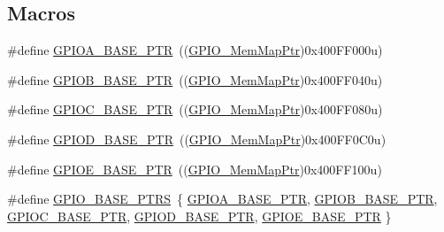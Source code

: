 \subsection*{Macros}
\begin{DoxyCompactItemize}
\item 
\#define \hyperlink{group___g_p_i_o___peripheral_ga3a8bd75d8b47b51132005ce9bbcbab7f}{G\+P\+I\+O\+A\+\_\+\+B\+A\+S\+E\+\_\+\+P\+TR}~((\hyperlink{group___g_p_i_o___peripheral_ga31c1eddda45aa085f51142987e05ada5}{G\+P\+I\+O\+\_\+\+Mem\+Map\+Ptr})0x400\+F\+F000u)
\item 
\#define \hyperlink{group___g_p_i_o___peripheral_ga3f4701cf222c28bfdcc2768a296b4171}{G\+P\+I\+O\+B\+\_\+\+B\+A\+S\+E\+\_\+\+P\+TR}~((\hyperlink{group___g_p_i_o___peripheral_ga31c1eddda45aa085f51142987e05ada5}{G\+P\+I\+O\+\_\+\+Mem\+Map\+Ptr})0x400\+F\+F040u)
\item 
\#define \hyperlink{group___g_p_i_o___peripheral_ga39b26484b0ad91fdbf93e27aa6ee7571}{G\+P\+I\+O\+C\+\_\+\+B\+A\+S\+E\+\_\+\+P\+TR}~((\hyperlink{group___g_p_i_o___peripheral_ga31c1eddda45aa085f51142987e05ada5}{G\+P\+I\+O\+\_\+\+Mem\+Map\+Ptr})0x400\+F\+F080u)
\item 
\#define \hyperlink{group___g_p_i_o___peripheral_ga080871bcecac6697912c87d4af0a8298}{G\+P\+I\+O\+D\+\_\+\+B\+A\+S\+E\+\_\+\+P\+TR}~((\hyperlink{group___g_p_i_o___peripheral_ga31c1eddda45aa085f51142987e05ada5}{G\+P\+I\+O\+\_\+\+Mem\+Map\+Ptr})0x400\+F\+F0\+C0u)
\item 
\#define \hyperlink{group___g_p_i_o___peripheral_ga5d17758f0829d938753761d4a53c0a7c}{G\+P\+I\+O\+E\+\_\+\+B\+A\+S\+E\+\_\+\+P\+TR}~((\hyperlink{group___g_p_i_o___peripheral_ga31c1eddda45aa085f51142987e05ada5}{G\+P\+I\+O\+\_\+\+Mem\+Map\+Ptr})0x400\+F\+F100u)
\item 
\#define \hyperlink{group___g_p_i_o___peripheral_gad0f7206167a584b1e75a81a5c30fa1c2}{G\+P\+I\+O\+\_\+\+B\+A\+S\+E\+\_\+\+P\+T\+RS}~\{ \hyperlink{group___g_p_i_o___peripheral_ga3a8bd75d8b47b51132005ce9bbcbab7f}{G\+P\+I\+O\+A\+\_\+\+B\+A\+S\+E\+\_\+\+P\+TR}, \hyperlink{group___g_p_i_o___peripheral_ga3f4701cf222c28bfdcc2768a296b4171}{G\+P\+I\+O\+B\+\_\+\+B\+A\+S\+E\+\_\+\+P\+TR}, \hyperlink{group___g_p_i_o___peripheral_ga39b26484b0ad91fdbf93e27aa6ee7571}{G\+P\+I\+O\+C\+\_\+\+B\+A\+S\+E\+\_\+\+P\+TR}, \hyperlink{group___g_p_i_o___peripheral_ga080871bcecac6697912c87d4af0a8298}{G\+P\+I\+O\+D\+\_\+\+B\+A\+S\+E\+\_\+\+P\+TR}, \hyperlink{group___g_p_i_o___peripheral_ga5d17758f0829d938753761d4a53c0a7c}{G\+P\+I\+O\+E\+\_\+\+B\+A\+S\+E\+\_\+\+P\+TR} \}
\end{DoxyCompactItemize}
